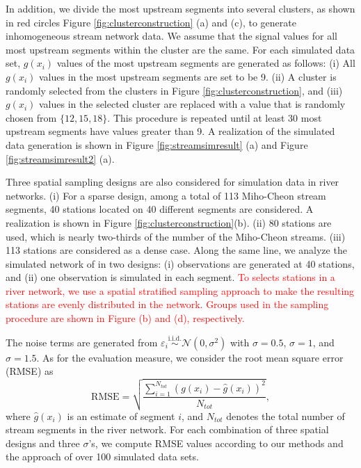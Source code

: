 \documentclass[11pt,titlepage]{article}
\begin{document}
In addition, we divide the most upstream segments into several clusters, as shown in red circles Figure \ref{fig:clusterconstruction} (a) and (c), to generate inhomogeneous stream network data. We assume that the signal values for all most upstream segments within the cluster are the same. For each simulated data set, $g(x_i)$ values of the most upstream segments are generated as follows: (i) All $g(x_i)$ values in the most upstream segments are set to be 9. (ii) A cluster is randomly selected from the clusters in Figure  \ref{fig:clusterconstruction}, and (iii) $g(x_i)$ values in the selected cluster are replaced with a value that is randomly chosen from $\{12, 15, 18\}$. This procedure is repeated until at least 30 most upstream segments have values greater than 9. A realization of the simulated data generation is shown in Figure \ref{fig:streamsimresult} (a) and Figure \ref{fig:streamsimresult2} (a).

Three spatial sampling designs are also considered for simulation data in river networks. (i) For a sparse design, among a total of 113 Miho-Cheon stream segments, 40 stations located on 40 different segments are considered. A realization is shown in Figure \ref{fig:clusterconstruction}(b). (ii) 80 stations are used, which is nearly two-thirds of the number of the Miho-Cheon streams. (iii) 113 stations are considered as a dense case. Along the same line, we analyze the simulated network of \cite{Gallacher2017} in two designs: (i) observations are generated at 40 stations, and (ii) one observation is simulated in each segment. 
\textcolor{red}{To selects stations in a river network, we use a spatial stratified sampling approach to make the resulting stations are evenly distributed in the network. Groups used in the sampling procedure are shown in Figure (b) and (d), respectively.} 

The noise terms are generated from $\varepsilon_{i} \stackrel{\text{i.i.d.}}{\sim} \mathcal{N}(0,\sigma^{2})$ with $\sigma=0.5$,  $\sigma=1$, and $\sigma=1.5$. As for the evaluation measure, we consider the root mean square error (RMSE) as 
\[
\text{RMSE}=\sqrt{\frac{\sum_{i=1}^{N_{tot}} (g(x_i)-\hat{g}(x_i))^{2}} {N_{tot}}},
\]
where $\hat{g}(x_i)$ is an estimate of segment $i$, and $N_{tot}$ denotes the total number of stream segments in the river network. For each combination of three spatial designs and three $\sigma$'s, we compute RMSE values according to our methods and the approach of \cite{ODonnell2014} over 100 simulated data sets. 
\end{document}
